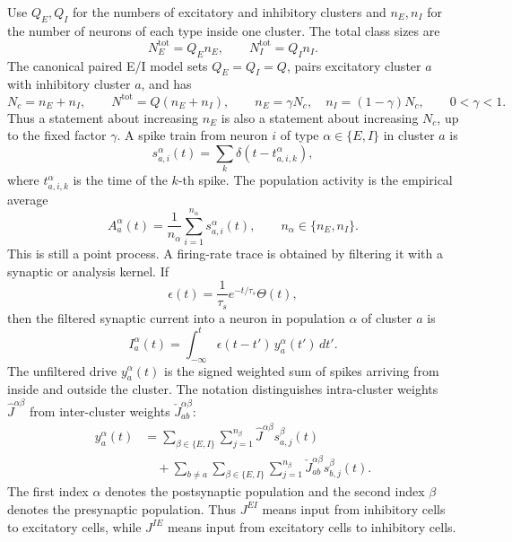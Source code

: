 Use \(Q_E,Q_I\) for the numbers of excitatory and inhibitory clusters and
\(n_E,n_I\) for the number of neurons of each type inside one cluster. The
total class sizes are
\[
    N_E^{\mathrm{tot}}=Q_E n_E,\qquad
    N_I^{\mathrm{tot}}=Q_I n_I .
\]
The canonical paired E/I model sets \(Q_E=Q_I=Q\), pairs excitatory cluster
\(a\) with inhibitory cluster \(a\), and has
\begin{equation}
    N_c=n_E+n_I,
    \qquad
    N^{\mathrm{tot}}=Q(n_E+n_I),
    \qquad
    n_E=\gamma N_c,\quad
    n_I=(1-\gamma)N_c,
    \qquad 0<\gamma<1.
    \label{eq:ch08-fixed-ei-fractions}
\end{equation}
Thus a statement about increasing \(n_E\) is also a statement about increasing
\(N_c\), up to the fixed factor \(\gamma\). A spike train from neuron \(i\) of
type \(\alpha\in\{E,I\}\) in cluster \(a\) is
\begin{equation}
    s_{a,i}^{\alpha}(t)
    =
    \sum_k \delta\!\left(t-t_{a,i,k}^{\alpha}\right),
    \label{eq:ch08-spike-train}
\end{equation}
where \(t_{a,i,k}^{\alpha}\) is the time of the \(k\)-th spike. The population
activity is the empirical average
\begin{equation}
    A_a^\alpha(t)
    =
    \frac{1}{n_\alpha}
    \sum_{i=1}^{n_\alpha} s_{a,i}^{\alpha}(t),
    \qquad n_\alpha\in\{n_E,n_I\}.
    \label{eq:ch08-population-activity}
\end{equation}
This is still a point process. A firing-rate trace is obtained by filtering it
with a synaptic or analysis kernel. If
\begin{equation}
    \epsilon(t)=\frac{1}{\tau_s}e^{-t/\tau_s}\Theta(t),
\end{equation}
then the filtered synaptic current into a neuron in population \(\alpha\) of
cluster \(a\) is
\begin{equation}
    I_a^\alpha(t)
    =
    \int_{-\infty}^{t}
    \epsilon(t-t')\,y_a^\alpha(t')\,dt'.
    \label{eq:ch08-filtered-current}
\end{equation}
The unfiltered drive \(y_a^\alpha(t)\) is the signed weighted sum of spikes
arriving from inside and outside the cluster. The notation distinguishes
intra-cluster weights \(\widehat J^{\alpha\beta}\) from inter-cluster weights
\(\check J_{ab}^{\alpha\beta}\):
\begin{equation}
\begin{aligned}
    y_a^\alpha(t)
    &=
    \sum_{\beta\in\{E,I\}}
    \sum_{j=1}^{n_\beta}
    \widehat J^{\alpha\beta} s_{a,j}^{\beta}(t)
    \\
    &\quad+
    \sum_{b\ne a}
    \sum_{\beta\in\{E,I\}}
    \sum_{j=1}^{n_\beta}
    \check J_{ab}^{\alpha\beta} s_{b,j}^{\beta}(t).
\end{aligned}
\label{eq:ch08-microscopic-drive}
\end{equation}
The first index \(\alpha\) denotes the postsynaptic population and the second
index \(\beta\) denotes the presynaptic population. Thus \(J^{EI}\) means input
from inhibitory cells to excitatory cells, while \(J^{IE}\) means input from
excitatory cells to inhibitory cells.


